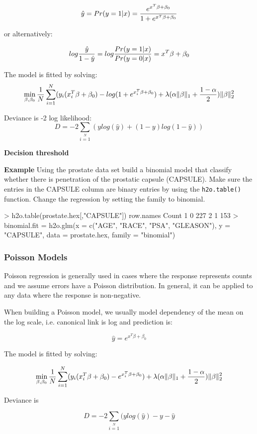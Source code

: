 \documentclass[11pt]{article}
\begin{document}
\[ \hat{y} = Pr(y = 1|x) = {e^{x^T\beta + \beta_0} \over 1 + e^{x^T \beta + \beta_0} } \]

or alternatively:


\[log {\hat{y} \over 1- \hat{y}} = log{Pr(y=1|x) \over Pr(y=0|x)} = x^T \beta + \beta_0\]

The model is fitted by solving:
\[  \min\limits_{\beta,\beta_0} { {1 \over N}\sum\limits_{i=1}\limits^{N}(y_i (x_i^{T}\beta  + \beta_0) - log (1 + e^{x_i^{T}\beta  + \beta_0} )  + \lambda (\alpha \|\beta \|_1 + {1-\alpha \over 2}) \| \beta \|_2^2} \]

Deviance is -2 log likelihood:
\[D = -2\sum\limits_{i=1}\limits^{N}{(y log(\hat{y}) + (1 - y)log(1-\hat{y})  )}\]

\textbf{Decision threshold}

\textbf{Example}
Using the prostate data set build a binomial model that classify whether there is penetration of the prostatic capsule (CAPSULE). Make sure the entries in the CAPSULE column are binary entries by using the \texttt{h2o.table()} function. Change the regression by setting the family to binomial.
\begin{spverbatim}
> h2o.table(prostate.hex[,"CAPSULE"])
  row.names Count
1         0   227
2         1   153
> binomial.fit = h2o.glm(x = c("AGE", "RACE", "PSA", "GLEASON"), y = "CAPSULE", data = prostate.hex, family = "binomial")
\end{spverbatim}

\subsubsection{Poisson Models}
Poisson regression is generally used in cases where the response represents counts and we assume errors have a Poisson distribution. In general, it can be applied to any data where the response is non-negative. 

When building a Poisson model, we usually model dependency of the mean on the log scale, i.e. canonical link is log and prediction is:

\[\hat{y} = e^{x^T\beta + \beta_0}\]

The model is fitted by solving:

\[  \min\limits_{\beta,\beta_0} { {1 \over N}\sum\limits_{i=1}\limits^{N}(y_i (x_i^{T}\beta  + \beta_0) - e^{x_i^{T}\beta  + \beta_0})  + \lambda (\alpha \|\beta \|_1 + {1-\alpha \over 2}) \| \beta \|_2^2} \]

Deviance is 

\[D = -2\sum\limits_{i=1}\limits^{N}{(y log(\hat{y}) - y - \hat{y}}\]
\end{document}
